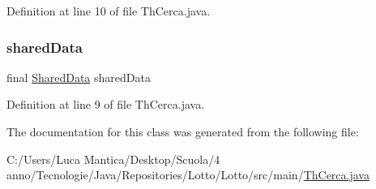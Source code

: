 Definition at line 10 of file Th\+Cerca.\+java.

\mbox{\label{classmain_1_1_th_cerca_ac5f1128ef8d0ba91a8214e03732e2662}} 
\subsubsection{\texorpdfstring{shared\+Data}{sharedData}}
{\footnotesize\ttfamily final \mbox{\hyperlink{classmain_1_1_shared_data}{Shared\+Data}} shared\+Data\hspace{0.3cm}{\ttfamily [private]}}



Definition at line 9 of file Th\+Cerca.\+java.



The documentation for this class was generated from the following file\+:\begin{DoxyCompactItemize}
\item 
C\+:/\+Users/\+Luca Mantica/\+Desktop/\+Scuola/4 anno/\+Tecnologie/\+Java/\+Repositories/\+Lotto/\+Lotto/src/main/\mbox{\hyperlink{_th_cerca_8java}{Th\+Cerca.\+java}}\end{DoxyCompactItemize}

